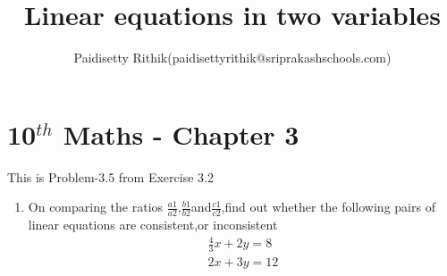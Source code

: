 \documentclass[12pt]{article}
\title{Linear equations in two variables}
\author{Paidisetty Rithik(paidisettyrithik@sriprakashschools.com)}
\begin{document}
\maketitle
\section*{10$^{th}$ Maths - Chapter 3}
This is Problem-3.5 from Exercise 3.2
\begin{enumerate}
\item On comparing the ratios $\frac{a1}{a2}$,$\frac{b1}{b2}$and$\frac{c1}{c2}$,find out whether the following pairs of linear equations are consistent,or inconsistent\\
\begin{align}
    \frac{4}{3}x+2y=8\\
       2x+3y=12\\
\end{align}



\end{enumerate}
\end{document}
